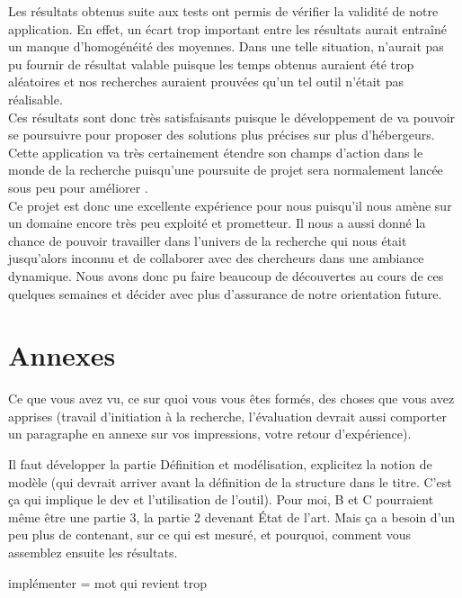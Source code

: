 \documentclass[10pt]{article}
\begin{document}
Les résultats obtenus suite aux tests ont permis de vérifier la validité de
notre application. En effet, un écart trop important entre les résultats aurait
entraîné un manque d'homogénéité des moyennes. Dans une telle situation,
\KYD n'aurait pas pu fournir de résultat valable puisque les temps 
obtenus auraient été trop aléatoires et nos recherches auraient prouvées qu'un 
tel outil n'était pas réalisable.\\


Ces résultats sont donc très satisfaisants puisque le développement de
\KYD va pouvoir se poursuivre pour proposer des solutions plus précises
sur plus d'hébergeurs. Cette application va très certainement étendre son
champs d'action dans le monde de la recherche puisqu'une poursuite de projet
sera normalement lancée sous peu pour améliorer \KYD.\\

Ce projet est donc une excellente expérience pour nous puisqu'il nous amène sur
un domaine encore très peu exploité et prometteur. Il nous a aussi donné la
chance de pouvoir travailler dans l'univers de la recherche qui nous était
jusqu'alors inconnu et de collaborer avec des chercheurs dans une ambiance
dynamique. Nous avons donc pu faire beaucoup de découvertes au cours de ces
quelques semaines et décider avec plus d'assurance de notre orientation
future.\\


\section{Annexes}

Ce que vous avez vu, ce sur quoi vous vous êtes formés, des choses que vous
avez apprises (travail d'initiation à la recherche, l'évaluation devrait aussi
comporter un paragraphe en annexe sur vos impressions, votre retour
d'expérience).


Il faut développer la partie Définition et modélisation, explicitez
la notion de modèle (qui devrait arriver avant la définition de la structure
dans le titre. C'est ça qui implique le dev et l'utilisation de l'outil). Pour
moi, B et C pourraient même être une partie 3, la partie 2 devenant État de
l'art. Mais ça a besoin d'un peu plus de contenant, sur ce qui est mesuré, et
pourquoi, comment vous assemblez ensuite les résultats.

implémenter = mot qui revient trop
\end{document}
